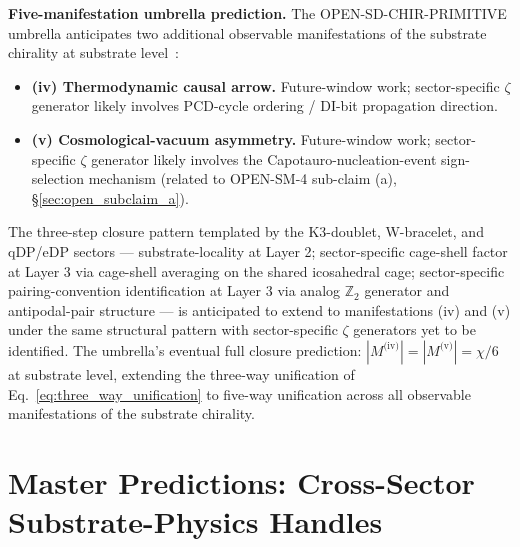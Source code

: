 \documentclass[11pt,letterpaper]{article}
\begin{document}
\textbf{Five-manifestation umbrella prediction.} The OPEN-SD-CHIR-PRIMITIVE umbrella anticipates two additional observable manifestations of the substrate chirality at substrate level~\cite{abshier_research_frontier}:

\begin{itemize}\setlength\itemsep{0.2em}
    \item \textbf{(iv) Thermodynamic causal arrow.} Future-window work; sector-specific $\zeta$ generator likely involves PCD-cycle ordering / DI-bit propagation direction.
    \item \textbf{(v) Cosmological-vacuum asymmetry.} Future-window work; sector-specific $\zeta$ generator likely involves the Capotauro-nucleation-event sign-selection mechanism (related to OPEN-SM-4 sub-claim (a), \S\ref{sec:open_subclaim_a}).
\end{itemize}

The three-step closure pattern templated by the K3-doublet, W-bracelet, and qDP/eDP sectors --- substrate-locality at Layer 2; sector-specific cage-shell factor at Layer 3 via cage-shell averaging on the shared icosahedral cage; sector-specific pairing-convention identification at Layer 3 via analog $\mathbb{Z}_2$ generator and antipodal-pair structure --- is anticipated to extend to manifestations (iv) and (v) under the same structural pattern with sector-specific $\zeta$ generators yet to be identified. The umbrella's eventual full closure prediction: $|M^{\text{(iv)}}| = |M^{\text{(v)}}| = \chi/6$ at substrate level, extending the three-way unification of Eq.~\eqref{eq:three_way_unification} to five-way unification across all observable manifestations of the substrate chirality.

\section{Master Predictions: Cross-Sector Substrate-Physics Handles}\label{sec:dplr}
\end{document}
